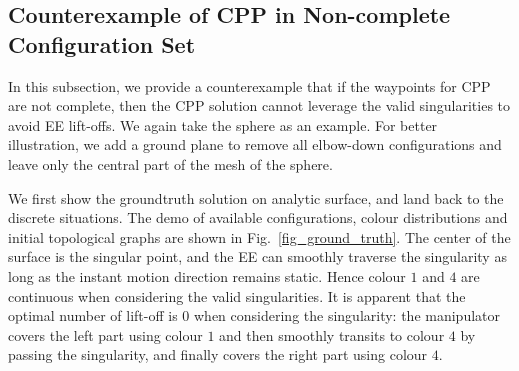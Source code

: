\documentclass[Afour,sageh,times]{sagej}
\begin{document}
\subsection{Counterexample of CPP in Non-complete Configuration Set}
In this subsection, we provide a counterexample that if the waypoints for CPP are not complete, then the CPP solution cannot leverage the valid singularities to avoid EE lift-offs. 
We again take the sphere as an example. 
For better illustration, we add a ground plane to remove all elbow-down configurations and leave only the central part of the mesh of the sphere. 

We first show the groundtruth solution on analytic surface, and land back to the discrete situations. 
The demo of available configurations, colour distributions and initial topological graphs are shown in Fig.~\ref{fig_ground_truth}. 
The center of the surface is the singular point, and the EE can smoothly traverse the singularity as long as the instant motion direction remains static. Hence colour $1$ and $4$ are continuous when considering the valid singularities. 
It is apparent that the optimal number of lift-off is $0$ when considering the singularity: the manipulator covers the left part using colour $1$ and then smoothly transits to colour $4$ by passing the singularity, and finally covers the right part using colour $4$. 
\end{document}
